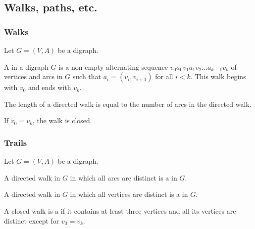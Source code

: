 \documentclass[aspectratio=169]{beamer}
\begin{document}
\subsection{Walks, paths, etc.}
\begin{frame}\frametitle{Walks}
	Let $G=(V,A)$ be a digraph.
	\begin{definition}
	A  in a digraph $G$ is a non-empty alternating sequence $v_0 a_0 v_1 a_1 v_2 \dots a_{k-1} v_k$ of vertices and arcs in $G$ such that $a_i=(v_i, v_{i+1})$ for all $i<k$. 
	This walk begins with $v_0$ and ends with $v_k$.
	\end{definition}
	\begin{definition}
	The length of a directed walk is equal to the number of arcs in the directed walk.
	\end{definition}
	\begin{definition}
	If $v_0=v_k$, the walk is closed.
	\end{definition}
\end{frame}


\begin{frame}\frametitle{Trails}
	Let $G=(V,A)$ be a digraph.
	\begin{definition}
	A directed walk in $G$ in which all arcs are distinct is a  in $G$.
	\end{definition}
	\begin{definition}
	A directed walk in $G$ in which all vertices are distinct is a  in $G$.
	\end{definition}
	\begin{definition}
	A closed walk is a  if it contains at least three vertices and all its vertices are distinct except for $v_0=v_k$.
	\end{definition}
\end{frame}
\end{document}
